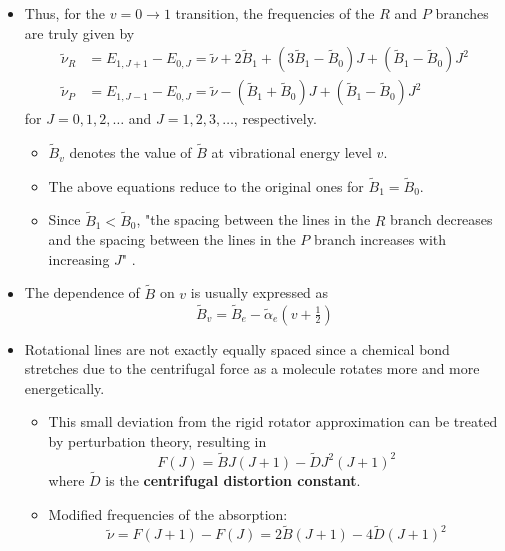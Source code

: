 \documentclass[../notes.tex]{subfiles}
\begin{document}
\begin{itemize}
\begin{itemize}
    \end{itemize}
    \item Thus, for the $v=0\to 1$ transition, the frequencies of the $R$ and $P$ branches are truly given by
    \begin{align*}
        \tilde{\nu}_R &= E_{1,J+1}-E_{0,J} = \tilde{\nu}+2\tilde{B}_1+(3\tilde{B}_1-\tilde{B}_0)J+(\tilde{B}_1-\tilde{B}_0)J^2\\
        \tilde{\nu}_P &= E_{1,J-1}-E_{0,J} = \tilde{\nu}-(\tilde{B}_1+\tilde{B}_0)J+(\tilde{B}_1-\tilde{B}_0)J^2
    \end{align*}
    for $J=0,1,2,\dots$ and $J=1,2,3,\dots$, respectively.
    \begin{itemize}
        \item $\tilde{B}_v$ denotes the value of $\tilde{B}$ at vibrational energy level $v$.
        \item The above equations reduce to the original ones for $\tilde{B}_1=\tilde{B}_0$.
        \item Since $\tilde{B}_1<\tilde{B}_0$, "the spacing between the lines in the $R$ branch decreases and the spacing between the lines in the $P$ branch increases with increasing $J$" \parencite[502]{bib:McQuarrieSimon}.
    \end{itemize}
    \item The dependence of $\tilde{B}$ on $v$ is usually expressed as
    \begin{equation*}
        \tilde{B}_v = \tilde{B}_e-\tilde{\alpha}_e(v+\tfrac{1}{2})
    \end{equation*}
    \item Rotational lines are not exactly equally spaced since a chemical bond stretches due to the centrifugal force as a molecule rotates more and more energetically.
    \begin{itemize}
        \item This small deviation from the rigid rotator approximation can be treated by perturbation theory, resulting in
        \begin{equation*}
            F(J) = \tilde{B}J(J+1)-\tilde{D}J^2(J+1)^2
        \end{equation*}
        where $\tilde{D}$ is the \textbf{centrifugal distortion constant}.
        \item Modified frequencies of the absorption:
        \begin{equation*}
            \tilde{\nu} = F(J+1)-F(J) = 2\tilde{B}(J+1)-4\tilde{D}(J+1)^2
        \end{equation*}

\end{itemize}
\end{itemize}
\end{document}
